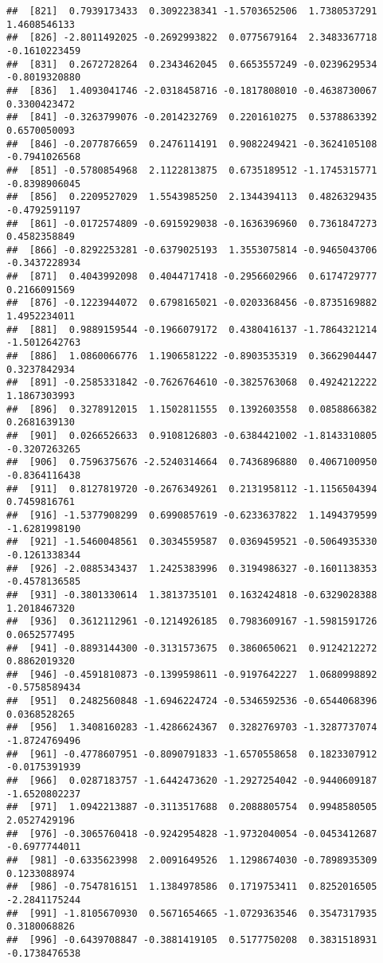 \documentclass[
  12pt,
]{article}
\begin{document}
\begin{verbatim}
##  [821]  0.7939173433  0.3092238341 -1.5703652506  1.7380537291  1.4608546133
##  [826] -2.8011492025 -0.2692993822  0.0775679164  2.3483367718 -0.1610223459
##  [831]  0.2672728264  0.2343462045  0.6653557249 -0.0239629534 -0.8019320880
##  [836]  1.4093041746 -2.0318458716 -0.1817808010 -0.4638730067  0.3300423472
##  [841] -0.3263799076 -0.2014232769  0.2201610275  0.5378863392  0.6570050093
##  [846] -0.2077876659  0.2476114191  0.9082249421 -0.3624105108 -0.7941026568
##  [851] -0.5780854968  2.1122813875  0.6735189512 -1.1745315771 -0.8398906045
##  [856]  0.2209527029  1.5543985250  2.1344394113  0.4826329435 -0.4792591197
##  [861] -0.0172574809 -0.6915929038 -0.1636396960  0.7361847273  0.4582358849
##  [866] -0.8292253281 -0.6379025193  1.3553075814 -0.9465043706 -0.3437228934
##  [871]  0.4043992098  0.4044717418 -0.2956602966  0.6174729777  0.2166091569
##  [876] -0.1223944072  0.6798165021 -0.0203368456 -0.8735169882  1.4952234011
##  [881]  0.9889159544 -0.1966079172  0.4380416137 -1.7864321214 -1.5012642763
##  [886]  1.0860066776  1.1906581222 -0.8903535319  0.3662904447  0.3237842934
##  [891] -0.2585331842 -0.7626764610 -0.3825763068  0.4924212222  1.1867303993
##  [896]  0.3278912015  1.1502811555  0.1392603558  0.0858866382  0.2681639130
##  [901]  0.0266526633  0.9108126803 -0.6384421002 -1.8143310805 -0.3207263265
##  [906]  0.7596375676 -2.5240314664  0.7436896880  0.4067100950 -0.8364116438
##  [911]  0.8127819720 -0.2676349261  0.2131958112 -1.1156504394  0.7459816761
##  [916] -1.5377908299  0.6990857619 -0.6233637822  1.1494379599 -1.6281998190
##  [921] -1.5460048561  0.3034559587  0.0369459521 -0.5064935330 -0.1261338344
##  [926] -2.0885343437  1.2425383996  0.3194986327 -0.1601138353 -0.4578136585
##  [931] -0.3801330614  1.3813735101  0.1632424818 -0.6329028388  1.2018467320
##  [936]  0.3612112961 -0.1214926185  0.7983609167 -1.5981591726  0.0652577495
##  [941] -0.8893144300 -0.3131573675  0.3860650621  0.9124212272  0.8862019320
##  [946] -0.4591810873 -0.1399598611 -0.9197642227  1.0680998892 -0.5758589434
##  [951]  0.2482560848 -1.6946224724 -0.5346592536 -0.6544068396  0.0368528265
##  [956]  1.3408160283 -1.4286624367  0.3282769703 -1.3287737074 -1.8724769496
##  [961] -0.4778607951 -0.8090791833 -1.6570558658  0.1823307912 -0.0175391939
##  [966]  0.0287183757 -1.6442473620 -1.2927254042 -0.9440609187 -1.6520802237
##  [971]  1.0942213887 -0.3113517688  0.2088805754  0.9948580505  2.0527429196
##  [976] -0.3065760418 -0.9242954828 -1.9732040054 -0.0453412687 -0.6977744011
##  [981] -0.6335623998  2.0091649526  1.1298674030 -0.7898935309  0.1233088974
##  [986] -0.7547816151  1.1384978586  0.1719753411  0.8252016505 -2.2841175244
##  [991] -1.8105670930  0.5671654665 -1.0729363546  0.3547317935  0.3180068826
##  [996] -0.6439708847 -0.3881419105  0.5177750208  0.3831518931 -0.1738476538
\end{verbatim}
\end{document}
